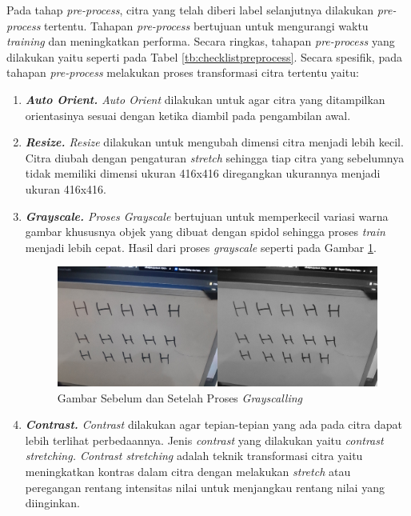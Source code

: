 Pada tahap \textit{pre-process}, citra yang telah diberi label selanjutnya dilakukan \textit{pre-process} tertentu. Tahapan \textit{pre-process} bertujuan untuk mengurangi waktu \textit{training} dan meningkatkan performa. Secara ringkas, tahapan \textit{pre-process} yang dilakukan yaitu seperti pada Tabel \ref*{tb:checklistpreprocess}. Secara spesifik, pada tahapan \textit{pre-process} melakukan proses transformasi citra tertentu yaitu:
\begin{enumerate}[nolistsep]
  \item \textit{\textbf{Auto Orient.} Auto Orient} dilakukan untuk agar citra yang ditampilkan orientasinya sesuai dengan ketika diambil pada pengambilan awal.
  \item \textit{\textbf{Resize.} Resize} dilakukan untuk mengubah dimensi citra menjadi lebih kecil. Citra diubah dengan pengaturan \textit{stretch} sehingga tiap citra yang sebelumnya tidak memiliki dimensi ukuran 416x416 diregangkan ukurannya menjadi ukuran 416x416.
  \item \textit{\textbf{Grayscale.} \textnormal{Proses} Grayscale} bertujuan untuk memperkecil variasi warna gambar khususnya objek yang dibuat dengan spidol sehingga proses \textit{train} menjadi lebih cepat. Hasil dari proses \textit{grayscale} seperti pada Gambar \ref{fig:grayscallingdataset}.
    \begin{figure}[H]
      \centering
      \includegraphics[scale=0.33]{gambar/grayscalling.png}
      \caption{Gambar Sebelum dan Setelah Proses \textit{Grayscalling}}
      \label{fig:grayscallingdataset}
    \end{figure}
  \item \textit{\textbf{Contrast.} Contrast} dilakukan agar tepian-tepian yang ada pada citra dapat lebih terlihat perbedaannya. Jenis \textit{contrast} yang dilakukan yaitu \textit{contrast stretching. Contrast stretching} adalah teknik transformasi citra yaitu meningkatkan kontras dalam citra dengan melakukan \textit{stretch} atau peregangan rentang intensitas nilai untuk menjangkau rentang nilai yang diinginkan.
\end{enumerate}

